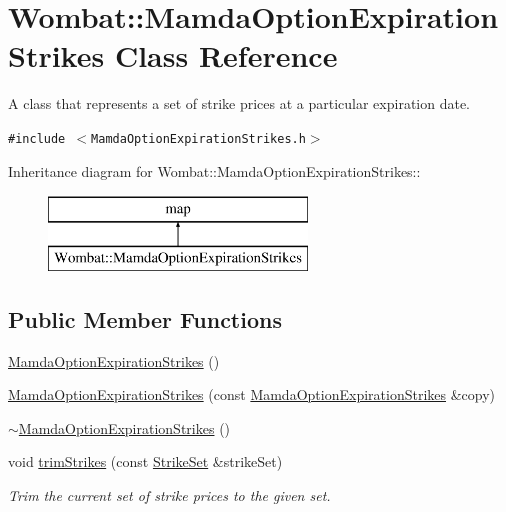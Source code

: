 \hypertarget{classWombat_1_1MamdaOptionExpirationStrikes}{
\section{Wombat::Mamda\-Option\-Expiration\-Strikes Class Reference}
\label{classWombat_1_1MamdaOptionExpirationStrikes}
}
A class that represents a set of strike prices at a particular expiration date.  


{\tt \#include $<$Mamda\-Option\-Expiration\-Strikes.h$>$}

Inheritance diagram for Wombat::Mamda\-Option\-Expiration\-Strikes::\begin{figure}[H]
\begin{center}
\leavevmode
\includegraphics[height=2cm]{classWombat_1_1MamdaOptionExpirationStrikes}
\end{center}
\end{figure}
\subsection*{Public Member Functions}
\begin{CompactItemize}
\item 
\hyperlink{classWombat_1_1MamdaOptionExpirationStrikes_38ff90fa99a2ea10a5e8f5cf3d4da984}{Mamda\-Option\-Expiration\-Strikes} ()
\item 
\hyperlink{classWombat_1_1MamdaOptionExpirationStrikes_3c6f6097d3bb45e4dab2c7beb053fc72}{Mamda\-Option\-Expiration\-Strikes} (const \hyperlink{classWombat_1_1MamdaOptionExpirationStrikes}{Mamda\-Option\-Expiration\-Strikes} \&copy)
\item 
\hyperlink{classWombat_1_1MamdaOptionExpirationStrikes_b14cea3c5ad5ebd030d6645061b78594}{$\sim$Mamda\-Option\-Expiration\-Strikes} ()
\item 
void \hyperlink{classWombat_1_1MamdaOptionExpirationStrikes_330d769f863bff08e54cc0c5bc618908}{trim\-Strikes} (const \hyperlink{namespaceWombat_302d481a195bac5c9315c82cdbc79447}{Strike\-Set} \&strike\-Set)
\begin{CompactList}\small\item\em Trim the current set of strike prices to the given set. \item\end{CompactList}\end{CompactItemize}


